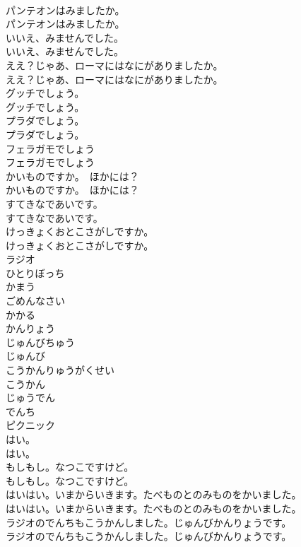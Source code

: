 \documentclass[8pt]{extreport}
\begin{document}
\begin{CJK}{UTF8}{min}
\\	パンテオンはみましたか。	
\\	パンテオンはみましたか。 
\\	いいえ、みませんでした。	
\\	いいえ、みませんでした。 
\\	ええ？じゃあ、ローマにはなにがありましたか。	
\\	ええ？じゃあ、ローマにはなにがありましたか。 
\\	グッチでしょう。	
\\	グッチでしょう。 
\\	プラダでしょう。	
\\	プラダでしょう。 
\\	フェラガモでしょう	
\\	フェラガモでしょう 
\\	かいものですか。　ほかには？	
\\	かいものですか。　ほかには？ 
\\	すてきなであいです。	
\\	すてきなであいです。 
\\	けっきょくおとこさがしですか。	
\\	けっきょくおとこさがしですか。 
\\	ラジオ
\\	ひとりぼっち
\\	かまう
\\	ごめんなさい
\\	かかる
\\	かんりょう
\\	じゅんびちゅう
\\	じゅんび
\\	こうかんりゅうがくせい
\\	こうかん
\\	じゅうでん
\\	でんち
\\	ピクニック
\\	はい。	
\\	はい。 
\\	もしもし。なつこですけど。	
\\	もしもし。なつこですけど。 
\\	はいはい。いまからいきます。たべものとのみものをかいました。	
\\	はいはい。いまからいきます。たべものとのみものをかいました。 
\\	ラジオのでんちもこうかんしました。じゅんびかんりょうです。	
\\	ラジオのでんちもこうかんしました。じゅんびかんりょうです。 

\end{CJK}
\end{document}
